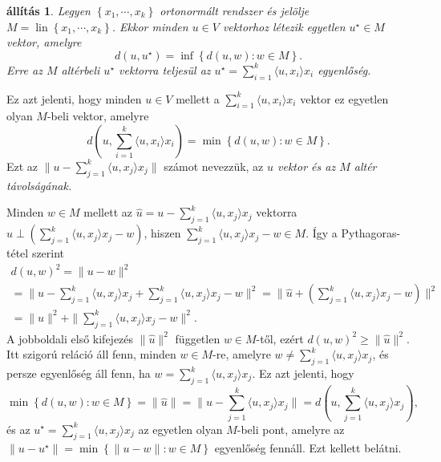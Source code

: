\documentclass[9pt, a4paper, showtrims]{memoir}
\makeatletter
\renewenvironment{proof}[1][\proofname]
    {\par\pushQED{\qed}%
    \normalfont \topsep6\p@\@plus6\p@\relax
    \trivlist
    \item[\hskip\labelsep
        \itshape
    #1\@addpunct{:}]\ignorespaces}
    {\popQED\endtrivlist\@endpefalse}
\theoremstyle{plain}
\newtheorem{proposition}{állítás}[chapter]
\theoremstyle{remark}
\theoremstyle{definition}
\DeclareMathOperator{\lin}{lin}
\newcommand{\ip}[2]{\langle#1,#2\rangle}
\makeatother
\begin{document}
\begin{proposition}
    Legyen $\left\{ x_1,\cdots,x_k \right\}$ ortonormált rendszer és 
    jelölje $M=\lin\left\{ x_1,\cdots,x_k \right\}$.
    Ekkor minden $u\in V$ vektorhoz létezik egyetlen $u^\star\in M$
    vektor, amelyre
    \[
        d\left( u,u^\star\right)
        =
        \inf\left\{ d\left( u,w \right):w\in M \right\}.
    \]
    Erre az $M$ altérbeli $u^\star$ vektorra teljesül az $u^\star=\sum_{i=1}^k\ip{u}{x_i}x_i$ egyenlőség.
\end{proposition}
Ez azt jelenti, 
hogy minden $u\in V$ mellett a 
    $\sum_{i=1}^k\ip{u}{x_i}x_i$
    vektor ez egyetlen olyan $M$-beli vektor, amelyre
    \[
        d\left( u,\sum_{i=1}^k\ip{u}{x_i}x_i \right)
        =
        \min\left\{ d\left( u,w \right):w\in M \right\}.
    \]
    Ezt az 
    \begin{math}
        \|u-\sum_{j=1}^k\ip{u}{x_j}x_j\|
    \end{math}
    számot nevezzük, az \emph{$u$ vektor és az $M$ altér távolságának.}
\begin{proof}
    Minden $w\in M$ mellett az $\hat{u}=u-\sum_{j=1}^k\ip{u}{x_j}x_j$ vektorra 
    $\hat{u}\perp \left( \sum_{j=1}^k\ip{u}{x_j}x_j-w \right)$,
    hiszen $\sum_{j=1}^k\ip{u}{x_j}x_j-w\in M$.
    Így a Pythagoras-tétel szerint
    \begin{multline*}
        d\left( u,w \right)^2
        =
        \|u-w\|^2
        \\
        =
        \|u-\sum_{j=1}^k\ip{u}{x_j}x_j+\sum_{j=1}^k\ip{u}{x_j}x_j-w\|^2
        =
        \|\hat{u}+\left( \sum_{j=1}^k\ip{u}{x_j}x_j-w \right)\|^2
        \\
        =
        \|\hat{u}\|^2+\|\sum_{j=1}^k\ip{u}{x_j}x_j-w\|^2.
    \end{multline*}
    A jobboldali első kifejezés $\|\hat{u}\|^2$ független $w\in M$-től,
    ezért 
    \begin{math}
        d\left( u,w \right)^2
        \geq
        \|\hat{u}\|^2.
    \end{math}
    Itt szigorú reláció áll fenn, minden $w\in M$-re, amelyre 
    $w\neq\sum_{j=1}^k\ip{u}{x_j}x_j $, 
    és persze egyenlőség áll fenn, ha 
    $w=\sum_{j=1}^k\ip{u}{x_j}x_j $.
    Ez azt jelenti,
    hogy 
    \[
        \min\left\{ d\left( u,w \right):w\in M \right\}
        =
        \|\hat{u}\|
        =
        \| u-\sum_{j=1}^k\ip{u}{x_j}x_j\|
        =
        d\left( u,\sum_{j=1}^k\ip{u}{x_j}x_j\right),
    \]
    és az $u^\star=\sum_{j=1}^k\ip{u}{x_j}x_j $ az egyetlen olyan $M$-beli pont, amelyre 
    az
    $\|u-u^\star\|=\min\left\{ \|u-w\|:w\in M  \right\}$ egyenlőség fennáll.
    Ezt kellett belátni. 
\end{proof}
\end{document}
